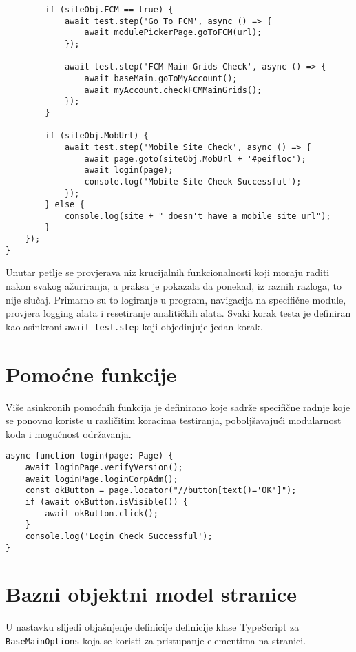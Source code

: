 \begin{verbatim}
        if (siteObj.FCM == true) {
            await test.step('Go To FCM', async () => {
                await modulePickerPage.goToFCM(url);
            });

            await test.step('FCM Main Grids Check', async () => {
                await baseMain.goToMyAccount();
                await myAccount.checkFCMMainGrids();
            });
        }

        if (siteObj.MobUrl) {
            await test.step('Mobile Site Check', async () => {
                await page.goto(siteObj.MobUrl + '#peifloc');
                await login(page);
                console.log('Mobile Site Check Successful');
            });
        } else {
            console.log(site + " doesn't have a mobile site url");
        }
    });
}
\end{verbatim}

Unutar petlje se provjerava niz krucijalnih funkcionalnosti koji moraju raditi nakon svakog ažuriranja, a praksa je pokazala da ponekad, iz raznih razloga, to nije slučaj.
Primarno su to logiranje u program, navigacija na specifične module, provjera logging alata i resetiranje analitičkih alata.
Svaki korak testa je definiran kao asinkroni \texttt{await test.step} koji objedinjuje jedan korak.

\section{Pomoćne funkcije}

Više asinkronih pomoćnih funkcija je definirano koje sadrže specifične radnje koje se ponovno koriste u različitim koracima testiranja, poboljšavajući modularnost koda i mogućnost održavanja.

\begin{verbatim}
async function login(page: Page) {
    await loginPage.verifyVersion();
    await loginPage.loginCorpAdm();
    const okButton = page.locator("//button[text()='OK']");
    if (await okButton.isVisible()) {
        await okButton.click();
    }
    console.log('Login Check Successful');
}
\end{verbatim}

\section{Bazni objektni model stranice}

U nastavku slijedi objašnjenje definicije definicije klase TypeScript za \texttt{BaseMainOptions} koja se koristi za pristupanje elementima na stranici.

